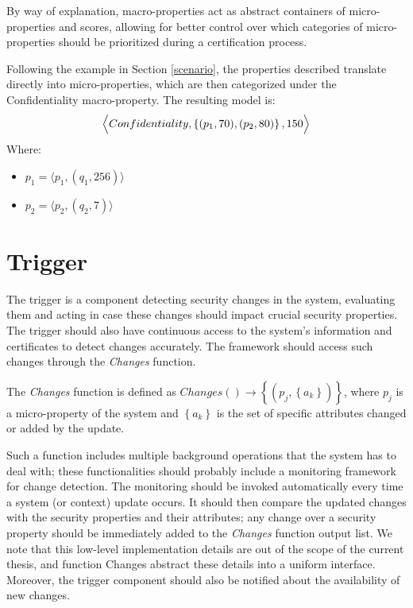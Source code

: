 By way of explanation, macro-properties act as abstract containers of micro-properties and scores, allowing for better control over which categories of micro-properties should be prioritized during a certification process.

\begin{example}
Following the example in Section \ref{scenario}, the properties described translate directly into micro-properties, which are then categorized under the Confidentiality macro-property. The resulting model is:
\[ \Bigl\langle Confidentiality, \left \{(p_1, 70), (p_2, 80)\right \}, 150 \Bigr\rangle \]
Where:
\begin{itemize}
    \item \(p_1 = \langle \hat{p_1}, (q_1, 256)\rangle\)
    \item \(p_2 = \langle \hat{p_2}, (q_2, 7)\rangle\) 
\end{itemize}

\end{example}

\section{Trigger}
\label{trigger}
The trigger is a component detecting security changes in the system, evaluating them and acting in case these changes should impact crucial security properties. The trigger should also have continuous access to the system's information and certificates to detect changes accurately. The framework should access such changes through the \textit{Changes} function. 

\begin{defn}
The \textit{Changes} function is defined as \(Changes() \rightarrow \left \{ \left ( p_j, \left \{ a_k \right \} \right ) \right \} \), where \(p_j\) is a micro-property of the system and \( \left \{a_k \right \} \) is the set of specific attributes changed or added by the update.
\end{defn}

Such a function includes multiple background operations that the system has to deal with; these functionalities should probably include a monitoring framework for change detection. The monitoring should be invoked automatically every time a system (or context) update occurs. It should then compare the updated changes with the security properties and their attributes; any change over a security property should be immediately added to the \textit{Changes} function output list. We note that this low-level implementation details are out of the scope of the current thesis, and function Changes abstract these details into a uniform interface. Moreover, the trigger component should also be notified about the availability of new changes.


